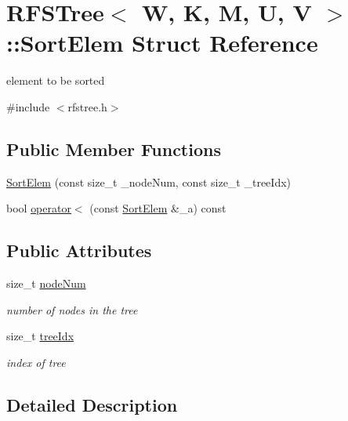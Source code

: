 \hypertarget{structRFSTree_1_1SortElem}{\section{R\-F\-S\-Tree$<$ W, K, M, U, V $>$\-:\-:Sort\-Elem Struct Reference}
\label{structRFSTree_1_1SortElem}
}


element to be sorted  




{\ttfamily \#include $<$rfstree.\-h$>$}

\subsection*{Public Member Functions}
\begin{DoxyCompactItemize}
\item 
\hyperlink{structRFSTree_1_1SortElem_ab0519910289f480eed4645139a647c57}{Sort\-Elem} (const size\-\_\-t \-\_\-node\-Num, const size\-\_\-t \-\_\-tree\-Idx)
\item 
bool \hyperlink{structRFSTree_1_1SortElem_aed0ff0605d0a60c515ff339b7bb4d771}{operator$<$} (const \hyperlink{structRFSTree_1_1SortElem}{Sort\-Elem} \&\-\_\-a) const 
\end{DoxyCompactItemize}
\subsection*{Public Attributes}
\begin{DoxyCompactItemize}
\item 
size\-\_\-t \hyperlink{structRFSTree_1_1SortElem_aae1299c3b2ef56d4cbad434f9dc7300b}{node\-Num}
\begin{DoxyCompactList}\small\item\em number of nodes in the tree \end{DoxyCompactList}\item 
size\-\_\-t \hyperlink{structRFSTree_1_1SortElem_ae8f9ed84510428c9d9f9904a1764b05f}{tree\-Idx}
\begin{DoxyCompactList}\small\item\em index of tree \end{DoxyCompactList}\end{DoxyCompactItemize}


\subsection{Detailed Description}
